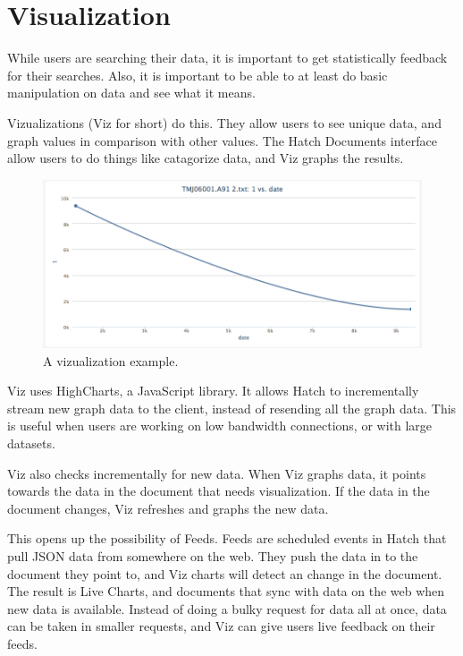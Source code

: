 \section{Visualization}
While users are searching their data, it is important to get statistically feedback
for their searches. Also, it is important to be able to at least do basic manipulation
on data and see what it means.

Vizualizations (Viz for short) do this. They allow users to see unique data, and graph 
values in comparison with other values. The Hatch Documents interface allow users to do 
things like catagorize data, and Viz graphs the results.

\begin{figure}[h]
	\begin{center}
	\includegraphics[width=120mm]{images/viz_ex1}
	\caption{A vizualization example.} 
	\label{viz_ex1}
	\end{center}
\end{figure}

Viz uses HighCharts, a JavaScript library. It allows Hatch to incrementally stream
new graph data to the client, instead of resending all the graph data. This is useful
when users are working on low bandwidth connections, or with large datasets. 

Viz also checks incrementally for new data. When Viz graphs data, it points towards the 
data in the document that needs visualization. If the data in the document changes,
Viz refreshes and graphs the new data.

This opens up the possibility of Feeds. Feeds are scheduled events in Hatch that pull
JSON data from somewhere on the web. They push the data in to the document they point
to, and Viz charts will detect an change in the document. 
The result is Live Charts, and documents that sync with data on the web when new data is 
available. Instead of doing a bulky request for data all at once, data can be taken
in smaller requests, and Viz can give users live feedback on their feeds.
